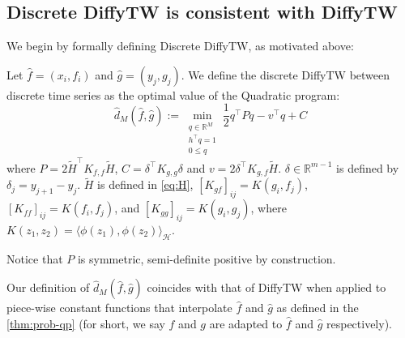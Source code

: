 

\subsection{Discrete DiffyTW is consistent with DiffyTW}\label{sec:consistent}
We begin by formally defining Discrete DiffyTW, as motivated above:
\begin{definition}\label{def:discrete-diffytw} Let $\hat f = (x_i, f_i)$ and $\hat g= (y_j, g_j)$. We define the discrete DiffyTW between discrete time series as the optimal value of the Quadratic program:
\begin{equation}\label{prob:qp}
    \hat d_M(\hat f, \hat g) :=\min_{\substack{q\in\mathbb R^{M}\\h^\top q=1\\0 \leq q}}\frac{1}{2}q^\top Pq - v^\top q + C
\end{equation}
where $P= 2\tilde H^\top K_{f, f}\tilde H$, $C= \delta^\top K_{g,g}\delta$ and $v= 2 \delta^\top K_{g,f}\tilde H$. $\delta\in\mathbb R^{m-1}$ is defined by $\delta_j = y_{j+1} - y_j$. $\tilde H$ is defined in \cref{eq:H}, $[K_{gf}]_{ij} = K(g_i, f_j)$, $[K_{ff}]_{ij} = K(f_i, f_j)$, and $[K_{gg}]_{ij} = K(g_i, g_j)$, where $K(z_1, z_2) = \langle \phi(z_1), \phi(z_2)\rangle_\mathcal H$.
\end{definition}
Notice that $P$ is symmetric, semi-definite positive by construction.

Our definition of $\hat d_M(\hat f, \hat g)$ coincides with that of DiffyTW when applied to piece-wise constant functions that interpolate $\hat f$ and $\hat g$ as defined in the \cref{thm:prob-qp} (for short, we say $f$ and $g$ are adapted to $\hat f$ and $\hat g$ respectively).

